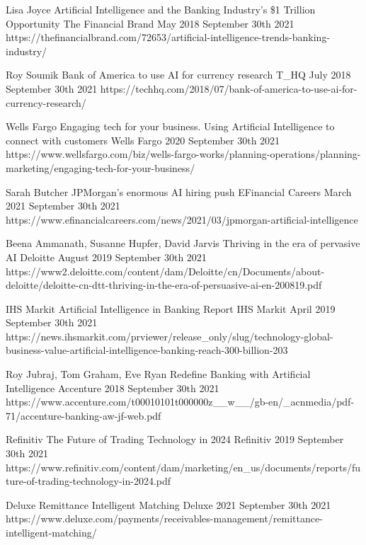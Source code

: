 \begin{thebibliography}{100}
{Lisa Joyce}
{Artificial Intelligence and the Banking Industry’s \$1 Trillion Opportunity}
{The Financial Brand}
{May 2018}
{September 30th 2021}
{https://thefinancialbrand.com/72653/artificial-intelligence-trends-banking-industry/}

{Roy Soumik}
{Bank of America to use AI for currency research}
{T\_HQ}
{July 2018}
{September 30th 2021}
{https://techhq.com/2018/07/bank-of-america-to-use-ai-for-currency-research/}

{Wells Fargo}
{Engaging tech for your business. Using Artificial Intelligence to connect with customers}
{Wells Fargo}
{2020}
{September 30th 2021}
{https://www.wellsfargo.com/biz/wells-fargo-works/planning-operations/planning-marketing/engaging-tech-for-your-business/}

{Sarah Butcher}
{JPMorgan's enormous AI hiring push}
{EFinancial Careers}
{March 2021}
{September 30th 2021}
{https://www.efinancialcareers.com/news/2021/03/jpmorgan-artificial-intelligence}

{Beena Ammanath, Susanne Hupfer, David Jarvis}
{Thriving in the era of pervasive AI}
{Deloitte}
{August 2019}
{September 30th 2021}
{https://www2.deloitte.com/content/dam/Deloitte/cn/Documents/about-deloitte/deloitte-cn-dtt-thriving-in-the-era-of-persuasive-ai-en-200819.pdf}

{IHS Markit}
{Artificial Intelligence in Banking Report}
{IHS Markit}
{April 2019}
{September 30th 2021}
{https://news.ihsmarkit.com/prviewer/release\_only/slug/technology-global-business-value-artificial-intelligence-banking-reach-300-billion-203}

{Roy Jubraj, Tom Graham, Eve Ryan}
{Redefine Banking with Artificial Intelligence}
{Accenture}
{2018}
{September 30th 2021}
{https://www.accenture.com/t00010101t000000z\_\_w\_\_/gb-en/\_acnmedia/pdf-71/accenture-banking-aw-jf-web.pdf}

{Refinitiv}
{The Future of Trading Technology in 2024}
{Refinitiv}
{2019}
{September 30th 2021}
{https://www.refinitiv.com/content/dam/marketing/en\_us/documents/reports/future-of-trading-technology-in-2024.pdf}

{Deluxe}
{Remittance Intelligent Matching}
{Deluxe}
{2021}
{September 30th 2021}
{https://www.deluxe.com/payments/receivables-management/remittance-intelligent-matching/}


\end{thebibliography}
